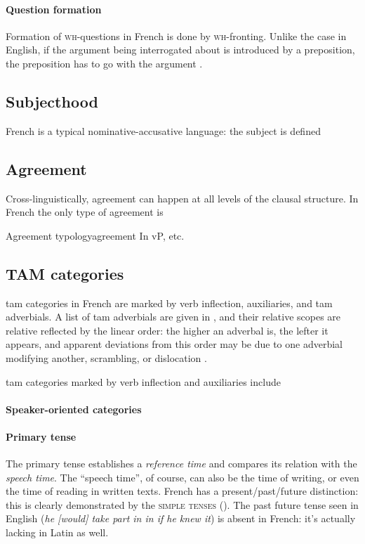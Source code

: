 \documentclass[a4paper, oneside, 12pt]{report}
\newcommand*{\citepage}[1]{p.~{#1}}
\newcommand*{\citepages}[1]{pp.~{#1}}
\newcommand{\form}[1]{\emph{#1}}
\newcommand*{\category}[1]{\textsc{#1}}
\begin{document}
\paragraph*{Question formation}
Formation of \category{wh}-questions in French is done by \category{wh}-fronting.
Unlike the case in English, if the argument being interrogated about is introduced by a preposition,
the preposition has to go with the argument \citep[\citepage{60}]{rowlett2007syntax}.

\subsection{Subjecthood}

French is a typical nominative-accusative language:
the subject is defined 

\subsection{Agreement}

Cross-linguistically, agreement can happen at all levels of the clausal structure.
In French the only type of agreement is 

\begin{todobox}{Agreement typology}{agreement}
    In vP, etc.
\end{todobox}

\subsection{TAM categories}\label{sec:grammatical.clause.tam}
\ac{tam} categories in French are marked by verb inflection, auxiliaries,
and \ac{tam} adverbials.
A list of \ac{tam} adverbials are given in \citet[\citepage{103, (3)}]{rowlett2007syntax},
and their relative scopes are relative reflected by the linear order:
the higher an adverbal is, the lefter it appears,
and apparent deviations from this order may be due to 
one adverbial modifying another,
scrambling, or dislocation \citep[\citepages{104-105}]{rowlett2007syntax}.

\ac{tam} categories marked by verb inflection and auxiliaries include 

\paragraph*{Speaker-oriented categories} 

\paragraph*{Primary tense}
The primary tense establishes a \emph{reference time}
and compares its relation with the \emph{speech time}.
The ``speech time'', of course, can also be the time of writing,
or even the time of reading in written texts. 
French has a present/past/future distinction:
this is clearly demonstrated by the \category{simple tenses}
(). 
The past future tense seen in English (\form{he [would] take part in in if he knew it})
is absent in French: it's actually lacking in Latin as well.
\end{document}

